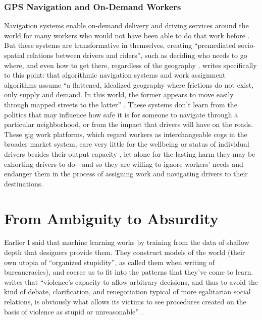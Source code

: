 \documentclass[manuscript,screen]{acmart}
\begin{document}
\subsubsection{GPS Navigation and On-Demand Workers}
Navigation systems enable on-demand delivery and driving services around the world for many workers who would not have been able to do that work before
\cite{pieceworkCrowdworkGigwork}.
But these systems are transformative in themselves, creating ``premediated socio-spatial relations between drivers and riders'', such as deciding who needs to go where, and even how to get there, regardless of the geography
\cite{chan2018mediatization}.
\citeauthor{GoJekAlgo} writes specifically to this point: that algorithmic navigation systems and work assignment algorithms assume ``a flattened, idealized geography where frictions do not exist, only supply and demand.
In this world, the former appears to move easily through mapped streets to the latter''
\cite{GoJekAlgo}.
These systems don't learn from the politics that may influence how safe it is for someone to navigate through a particular neighborhood, or from the impact that drivers will have on the roads.
These gig work platforms, which regard workers as interchangeable cogs in the broader market system, care very little for the wellbeing or status of individual drivers besides their output capacity
\cite{pieceworkCrowdworkGigwork}, let alone for the lasting harm they may be exhorting drivers to do - and so they are willing to ignore workers' needs and endanger them in the process of assigning work and navigating drivers to their destinations.


\section{From Ambiguity to Absurdity}

Earlier I said that machine learning works by training from the data of shallow depth that designers provide them.
They construct models of the world (their own utopia of ``organized stupidity'', as \citeauthor{graeber2015utopia} called them when writing of bureaucracies), and coerce us to fit into the patterns that they've come to learn.
\citeauthor{graeber2015utopia} writes that ``violence's capacity to allow arbitrary decisions, and thus to avoid the kind of debate, clarification, and renegotiation typical of more egalitarian social relations, is obviously what allows its victims to see procedures created on the basis of violence as stupid or unreasonable''
\cite{graeber2015utopia}.
\end{document}
